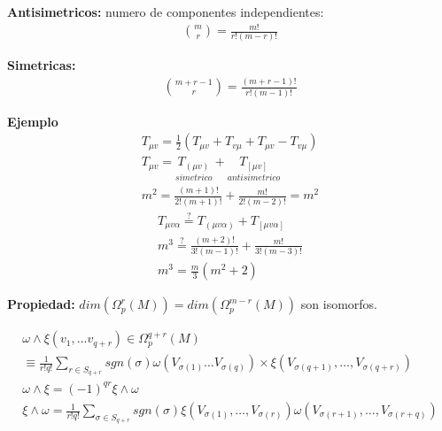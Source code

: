 \documentclass{article}
\begin{document}
\textbf{Antisimetricos: } numero de componentes independientes: 
\begin{gather*}
  \binom{m}{r} = \frac{m!}{r!(m - r)!}
\end{gather*}

\textbf{Simetricas:} 
\begin{gather*}
  \binom{m+r-1 }{r} = \frac{(m+r-1)! }{r!(m-1)!}
\end{gather*}

\textbf{Ejemplo} 
\begin{gather*}
  T _{\mu v } = \frac{1}{2} (T _{\mu v }  + T _{v \mu }  + T _{\mu v }  - T _{v \mu } )\\
  T _{\mu v } = \underset{simetrico }{T _{(\mu v )} }+ \underset{antisimetrico }{ T _{[\mu v ]}}\\
  m ^2 = \frac{(m+1)! }{2! (m+1)! } + \frac{m! }{2!(m-2)! } = m^2
\end{gather*}
\begin{gather*}
  T _{\mu v \alpha } \overset{?}{=} T _{(\mu v \alpha) } + T _{[\mu v \alpha ]} \\
  m ^3 \overset{?}{=} \frac{(m + 2 )! }{3! (m-1)! } + \frac{m! }{3! (m-3)! } \\
  m^3 = \frac{m }{3 }(m^2 + 2 )
\end{gather*}

\textbf{Propiedad: } $ dim(\Omega _p^r (M)) = dim(\Omega_p^{m-r}(M)) $ son isomorfos.

\hfill 

\hfill 

\hfill 

\begin{gather*}
  \omega \land \xi (v_1,...v _{q + r } ) \in \Omega _p ^ {q + r }(M) \\
  \equiv \frac{1}{r!q! } \displaystyle\sum_{r\in S _{q + r } }^{}sgn(\sigma ) \omega (V _{\sigma(1) } \dots V _{\sigma(q)} ) \times \xi (V _{\sigma{(q + 1 )}} , \dots, V _{\sigma(q+r)} )\\
  \omega\land \xi = (-1)^ {qr } \xi \land \omega\\
  \xi \land \omega = \frac{1}{r! q! } \displaystyle\sum_{\sigma\in S _{q + r } }^{} sgn(\sigma) \xi (V _{\sigma(1) } , \dots, V _{\sigma(r)} ) \omega (V _{\sigma(r+1)} , \dots, V _{\sigma(r + q )} )
\end{gather*}
\end{document}
